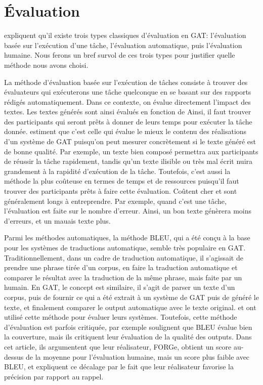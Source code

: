 
\chapter{Évaluation}\label{ch:eval}

\cite{ReiterInvestigationValidityMetrics2009} expliquent qu'il existe trois types classiques d'évaluation en \ac{GAT}: l'évaluation basée sur l'exécution d'une tâche, l'évaluation automatique, puis l'évaluation humaine. Nous ferons un bref survol de ces trois types pour justifier quelle méthode nous avons choisi.

La méthode d'évaluation basée sur l'exécution de tâches consiste à trouver des évaluateurs qui exécuterons une tâche quelconque en se basant sur des rapports rédigés automatiquement. Dans ce contexte, on évalue directement l'impact des textes.  Les textes générés sont ainsi évalués en fonction de  Ainsi, il faut trouver des participants qui seront prêts à donner de leurs temps pour exécuter la tâche donnée. \cite{ReiterInvestigationValidityMetrics2009} estiment que c'est celle qui évalue le mieux le contenu des réalisations d'un système de \ac{GAT} puisqu'on peut mesurer concrètement si le texte généré est de bonne qualité. Par exemple, un texte bien composé permettra aux participants de réussir la tâche rapidement, tandis qu'un texte ilisible ou très mal écrit nuira grandement à la rapidité d'exécution de la tâche. Toutefois, c'est aussi la méthode la plus coûteuse en termes de temps et de ressources puisqu'il faut trouver des participants prêts à faire cette évaluation. Coûtent cher et sont généralement longs à entreprendre. Par exemple, quand c'est une tâche, l'évaluation est faite sur le nombre d'erreur. Ainsi, un bon texte génèrera moins d'erreurs, et un mauais texte plus.

Parmi les méthodes automatiques, la méthode BLEU, qui a été conçu à la base pour les systèmes de traductions automatique, semble très populaire en \ac{GAT}. Traditionnellement, dans un cadre de traduction automatique, il s'agissait de prendre une phrase tirée d'un corpus, en faire la traduction automatique et comparer le résultat avec la traduction de la même phrase, mais faite par un humain. En \ac{GAT}, le concept est similaire, il s'agit de parser  un texte d'un corpus, puis de fournir ce qui a été extrait à un système de \ac{GAT} puis de généré le texte, et finalement comparer le output automatique avec le texte original. \cite{Langkilde-gearyForestbasedstatisticalsentence2000} et \cite{Habash2003MatadorAL} ont utilisé cette méthode pour évaluer leurs systèmes. Toutefois, cette méthode d'évaluation est parfois critiquée, par exemple \cite{DBLP:conf/semeval/MilleCBW17} soulignent que BLEU évalue bien la couverture, mais ils critiquent leur évaluation de la qualité des outputs. Dans cet article, ils argumentent que leur réalisateur, FORGe, obtient un score au-dessus de la moyenne pour l'évaluation humaine, mais un score plus faible avec BLEU, et expliquent ce décalage par le fait que leur réalisateur favorise la précision par rapport au rappel.

